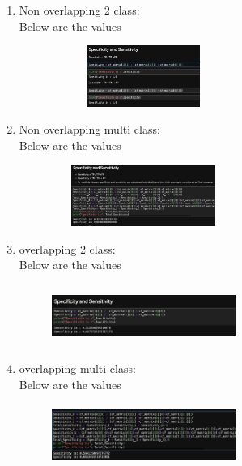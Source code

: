 \documentclass[conference]{IEEEtran}
\begin{document}
\begin{enumerate}
    \item 
    Non overlapping 2 class: \\
Below are the values \\
\begin{figure}[!htbp]
    \centering
    \includegraphics[width=6cm, height=2cm]{task2.27.png}
    \label{fig:my_label}
\end{figure}
\item
Non overlapping multi class: \\
Below are the values \\
\begin{figure}[!htbp]
    \centering
    \includegraphics[width=6cm, height=2cm]{task2.28.png}
    \label{fig:my_label}
\end{figure}
\item
overlapping 2 class: \\
Below are the values \\
\begin{figure}[!htbp]
    \centering
    \includegraphics[width=6cm, height=2cm]{task2.29.png}
    \label{fig:my_label}
\end{figure}
\item
overlapping multi class: \\
Below are the values \\
\begin{figure}[!htbp]
    \centering
    \includegraphics[width=6cm, height=2cm]{task2.30.png}
    \label{fig:my_label}
\end{figure}
    

\end{enumerate}
\end{document}
